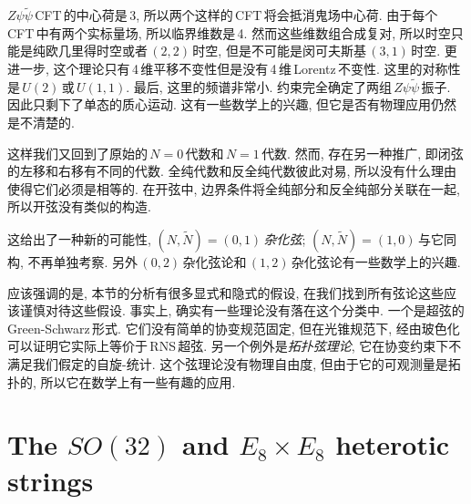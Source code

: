 $Z\psi\tilde{\psi}\,$CFT\,的中心荷是\,3, 所以两个这样的\,CFT\,将会抵消鬼场中心荷. 由于每个\,CFT\,中有两个实标量场, 所以临界维数是\,4. 然而这些维数组合成复对, 所以时空只能是纯欧几里得时空或者$\,(2,2)\,$时空, 但是不可能是闵可夫斯基$\,(3,1)\,$时空. 更进一步, 这个理论只有\,4\,维平移不变性但是没有\,4\,维\,Lorentz\,不变性. 这里的对称性是$\,U(2)\,$或$\,U(1,1)$. 最后, 这里的频谱非常小. 约束完全确定了两组$\,Z\psi\tilde{\psi}\,$振子. 因此只剩下了单态的质心运动. 这有一些数学上的兴趣, 但它是否有物理应用仍然是不清楚的.

这样我们又回到了原始的$\,N=0\,$代数和$\,N=1\,$代数. 然而, 存在另一种推广, 即闭弦的左移和右移有不同的代数. 全纯代数和反全纯代数彼此对易, 所以没有什么理由使得它们必须是相等的. 在开弦中, 边界条件将全纯部分和反全纯部分关联在一起, 所以开弦没有类似的构造.

这给出了一种新的可能性, $(N,\tilde{N})=(0,1)$\,{\emph{杂化弦}}; $(N,\tilde{N})=(1,0)$\,与它同构, 不再单独考察. 另外$\,(0,2)\,$杂化弦论和$\,(1,2)\,$杂化弦论有一些数学上的兴趣.

应该强调的是, 本节的分析有很多显式和隐式的假设, 在我们找到所有弦论这些应该谨慎对待这些假设. 事实上, 确实有一些理论没有落在这个分类中. 一个是超弦的\,Green-Schwarz\,形式. 它们没有简单的协变规范固定, 但在光锥规范下, 经由玻色化可以证明它实际上等价于\,RNS\,超弦. 另一个例外是{\emph{拓扑弦理论}}, 它在协变约束下不满足我们假定的自旋-统计. 这个弦理论没有物理自由度, 但由于它的可观测量是拓扑的, 所以它在数学上有一些有趣的应用.




\section{\texorpdfstring{The $SO(32)$ and $E_{8}\times E_{8}$ heterotic strings}{The SO(32) and E8 X E8 heterotic strings}}

